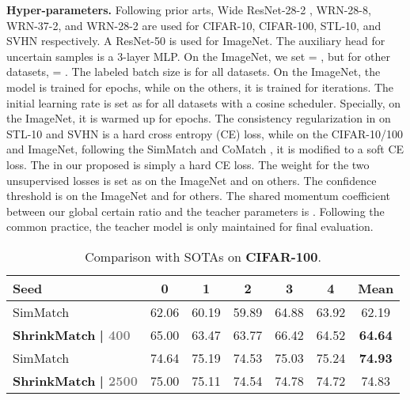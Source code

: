 \documentclass[10pt,twocolumn,letterpaper]{article}
\begin{document}
\vspace{1mm}
\noindent
\textbf{Hyper-parameters.} Following prior arts, Wide ResNet-28-2  \cite{wrn}, WRN-28-8, WRN-37-2, and WRN-28-2 are used for CIFAR-10, CIFAR-100, STL-10, and SVHN respectively. A ResNet-50 \cite{resnet} is used for ImageNet. The auxiliary head  for uncertain samples is a 3-layer MLP. On the ImageNet, we set  = , but for other datasets,  = . The labeled batch size is  for all datasets. On the ImageNet, the model is trained for  epochs, while on the others, it is trained for  iterations. The initial learning rate is set as  for all datasets with a cosine scheduler. Specially, on the ImageNet, it is warmed up for  epochs. The consistency regularization  in  on STL-10 and SVHN is a hard cross entropy (CE) loss, while on the CIFAR-10/100 and ImageNet, following the SimMatch and CoMatch \cite{comatch}, it is modified to a soft CE loss. The  in our proposed  is simply a hard CE loss. The weight  for the two unsupervised losses is set as  on the ImageNet and  on others. The confidence threshold  is  on the ImageNet and  for others. The shared momentum coefficient  between our global certain ratio  and the teacher parameters is . Following the common practice, the teacher model is only maintained for final evaluation.

\begin{table}[t]
\centering
\small
\renewcommand{\arraystretch}{1.1}
\setlength\tabcolsep{1.05mm}
    \centering
    \begin{tabular}{l|ccccc|c}
    \toprule
    
    Seed & 0 & 1 & 2 & 3 & 4 & Mean \\
    
    \midrule
    
    SimMatch \cite{simmatch} & 62.06 & 60.19 & 59.89 & 64.88 & 63.92 & 62.19 \\
    
    \textbf{ShrinkMatch} \textbf{| \textcolor{gray}{\footnotesize{400}}} & 65.00 & 63.47 & 63.77 & 66.42 & 64.52 & \textbf{64.64} \\
    
    \midrule
    
    SimMatch \cite{simmatch} & 74.64 & 75.19 & 74.53 & 75.03 & 75.24 & \textbf{74.93} \\
    
    \textbf{ShrinkMatch} \textbf{| \textcolor{gray}{\footnotesize{2500}}} & 75.00 & 75.11 & 74.54 & 74.78 & 74.72 & 74.83 \\
    
    \bottomrule

    \end{tabular}
    \vspace{-1mm}
    \caption{Comparison with SOTAs on \textbf{CIFAR-100}.}
    \vspace{-2mm}
    \label{tab:cifar100}
\end{table} 
\end{document}
